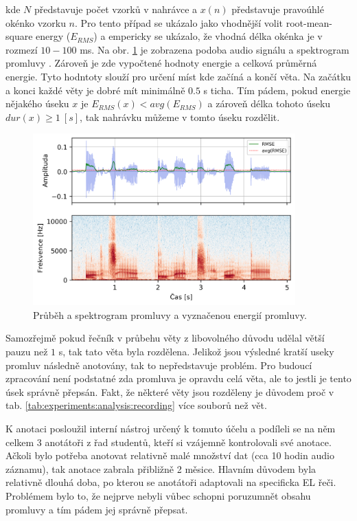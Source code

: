 \noindent kde $N$ představuje počet vzorků v nahrávce a $x(n)$ představuje pravoúhlé okénko vzorku $n$. Pro tento případ se ukázalo jako vhodnější volit root-mean-square energy ($E_{RMS}$) a empericky se ukázalo, že vhodná délka okénka je v rozmezí $10 - 100$ ms. Na obr. \ref{fig:experiments:analysis:speech} je zobrazena podoba audio signálu a spektrogram promluvy \textit{}. Zároveň je zde vypočtené hodnoty energie a celková průměrná energie. Tyto hodntoty slouží pro určení míst kde začíná a končí věta. Na začátku a konci každé věty je dobré mít minimálně $0.5$ s ticha. Tím pádem, pokud energie nějakého úseku $x$ je $E_{RMS}(x) < avg(E_{RMS})$ a zároveň délka tohoto úseku $dur(x) \geq 1\ [s]$, tak nahrávku můžeme v tomto úseku rozdělit.

\begin{figure}[hbpt]
  \centering
  \includegraphics[width=0.9\textwidth]{./ch4-experiments/img/el_energy_spec.png}
  \caption{Průběh a spektrogram promluvy a vyznačenou energií promluvy.}
  \label{fig:experiments:analysis:speech}
\end{figure}

Samozřejmě pokud řečník v průbehu věty z libovolného důvodu udělal větší pauzu než $1$ s, tak tato věta byla rozdělena. Jelikož jsou výsledné kratší useky promluv následně anotovány, tak to nepředstavuje problém. Pro budoucí zpracování není podstatné zda promluva je opravdu celá věta, ale to jestli je tento úsek správně přepsán. Fakt, že některé věty jsou rozděleny je důvodem proč v tab. \ref{tab:experiments:analysis:recording} více souborů než vět.

K anotaci posloužil interní nástroj určený k tomuto účelu a podíleli se na něm celkem 3 anotátoři z řad studentů, kteří si vzájemně kontrolovali své anotace. Ačkoli bylo potřeba anotovat relativně malé množství dat (cca 10 hodin audio záznamu), tak anotace zabrala přibližně 2 měsice. Hlavním důvodem byla relativně dlouhá doba, po kterou se anotátoři adaptovali na specificka EL řeči. Problémem bylo to, že nejprve nebyli vůbec schopni poruzumnět obsahu promluvy a tím pádem jej správně přepsat.

